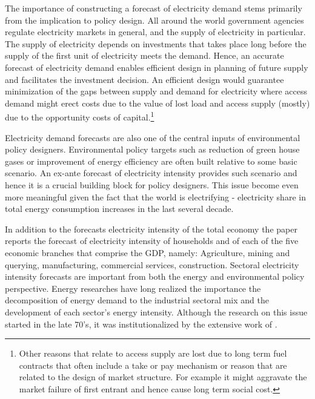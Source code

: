 \documentclass[]{amsart}
\begin{document}
The importance of constructing a forecast of electricity demand stems primarily from the implication to policy design. All around the world government agencies regulate electricity markets in general, and the supply of electricity in particular. The supply of electricity depends on investments that takes place long before the supply of the first unit of electricity meets the demand. Hence, an accurate forecast of electricity demand enables efficient design in planning of future supply and facilitates the investment decision. An efficient design would guarantee minimization of the gaps between supply and demand for electricity where access demand might erect costs due to the value of lost load and access supply (mostly) due to the opportunity costs of capital.\footnote{Other reasons that relate to access supply are lost due to long term fuel contracts that often include a take or pay mechanism or reason that are related to the design of market structure. For example it might aggravate the market failure of first entrant and hence cause long term social cost.}

\bigskip

Electricity demand forecasts are also one of the central inputs of environmental policy designers. Environmental policy targets such as reduction of green house gases or improvement of energy efficiency are often built relative to some basic scenario. An ex-ante forecast of electricity intensity provides such scenario and hence it is a crucial building block for policy designers. This issue become even more meaningful given the fact that the world is electrifying - electricity share in total energy consumption increases in the last several decade.

\bigskip

In addition to the forecasts electricity intensity of the total economy the paper reports the forecast of electricity intensity of households and of each of the five economic branches that comprise the GDP, namely: Agriculture, mining and querying, manufacturing, commercial services, construction. Sectoral electricity intensity forecasts are important from both the energy and environmental policy perspective. Energy researches have long realized the importance the decomposition of energy demand to the industrial sectoral mix and the development of each sector's energy intensity. Although the research on this issue started in the late 70's, it was institutionalized by the extensive work of \cite{ang1987structural,ang1995decomposition,Ang1999,ang2004decomposition}.
\end{document}
